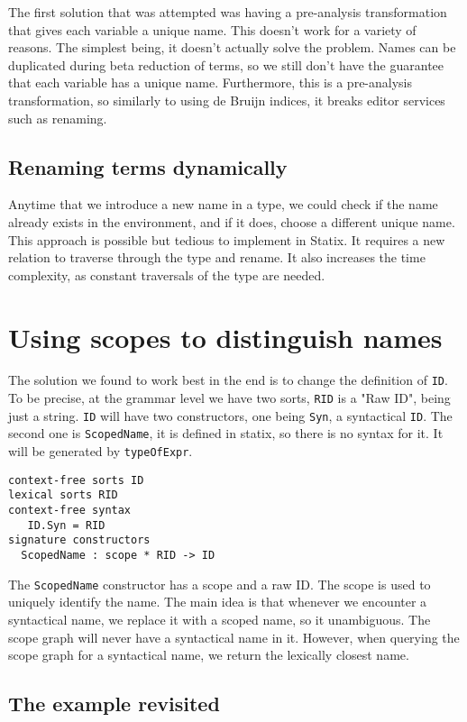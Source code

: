 The first solution that was attempted was having a pre-analysis transformation that gives each variable a unique name. This doesn't work for a variety of reasons. The simplest being, it doesn't actually solve the problem. Names can be duplicated during beta reduction of terms, so we still don't have the guarantee that each variable has a unique name. Furthermore, this is a pre-analysis transformation, so similarly to using de Bruijn indices, it breaks editor services such as renaming.

\subsection{Renaming terms dynamically}

Anytime that we introduce a new name in a type, we could check if the name already exists in the environment, and if it does, choose a different unique name. This approach is possible but tedious to implement in Statix. It requires a new relation to traverse through the type and rename. It also increases the time complexity, as constant traversals of the type are needed.


\section{Using scopes to distinguish names}

The solution we found to work best in the end is to change the definition of \verb|ID|. To be precise, at the grammar level we have two sorts, \verb|RID| is a "Raw ID", being just a string. \verb|ID| will have two constructors, one being \verb|Syn|, a syntactical \verb|ID|. The second one is \verb|ScopedName|, it is defined in statix, so there is no syntax for it. It will be generated by \verb|typeOfExpr|.

\begin{lstlisting}
context-free sorts ID
lexical sorts RID
context-free syntax
   ID.Syn = RID
signature constructors
  ScopedName : scope * RID -> ID
\end{lstlisting}

The \verb|ScopedName| constructor has a scope and a raw ID. The scope is used to uniquely identify the name. The main idea is that whenever we encounter a syntactical name, we replace it with a scoped name, so it unambiguous. The scope graph will never have a syntactical name in it. However, when querying the scope graph for a syntactical name, we return the lexically closest name.

\subsection{The example revisited}

